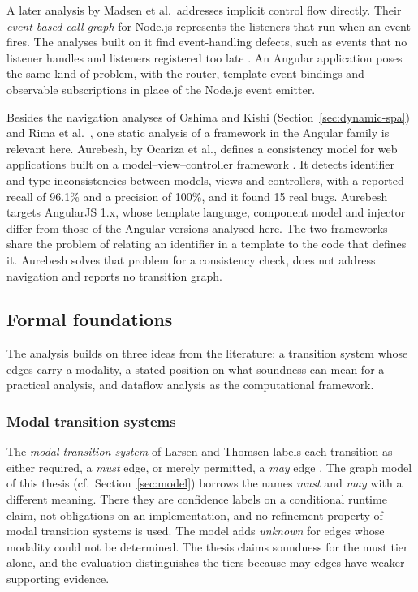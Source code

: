 A later analysis by Madsen et al.\ addresses implicit control flow directly. Their
\emph{event-based call graph} for Node.js represents the listeners that run when an event fires.
The analyses built on it find event-handling defects, such as events that no listener handles and
listeners registered too late \cite{madsen2015static}. An Angular application poses the same kind
of problem, with the router, template event bindings and observable subscriptions in place of the
Node.js event emitter.

Besides the navigation analyses of Oshima and Kishi (Section~\ref{sec:dynamic-spa}) and Rima et
al.\ \cite{rima2026e2e}, one static analysis of a framework in the Angular family is relevant
here. Aurebesh, by Ocariza et al., defines a consistency model for web applications built on a
model--view--controller framework \cite{ocariza2015detecting}. It detects identifier and type
inconsistencies between models, views and controllers, with a reported recall of 96.1\% and a
precision of 100\%, and it found 15 real bugs. Aurebesh targets AngularJS 1.x, whose template
language, component model and injector differ from those of the Angular versions analysed here.
The two frameworks share the problem of relating an identifier in a template to the code that
defines it. Aurebesh solves that problem for a consistency check, does not address navigation and
reports no transition graph.

\subsection{Formal foundations}
\label{sec:formal}

The analysis builds on three ideas from the literature: a transition system whose edges carry a
modality, a stated position on what soundness can mean for a practical analysis, and dataflow
analysis as the computational framework.

\subsubsection{Modal transition systems}

The \emph{modal transition system} of Larsen and Thomsen labels each transition as
either required, a \emph{must} edge, or merely permitted, a \emph{may} edge
\cite{larsen1988modal}. The graph model of this thesis (cf.~Section~\ref{sec:model}) borrows the names
\emph{must} and \emph{may} with a different meaning. There they are confidence labels on a
conditional runtime claim, not obligations on an implementation, and no refinement property of
modal transition systems is used. The model adds \emph{unknown} for edges whose modality could not
be determined.
The thesis claims soundness for the must tier alone, and the evaluation distinguishes the tiers
because may edges have weaker supporting evidence.

